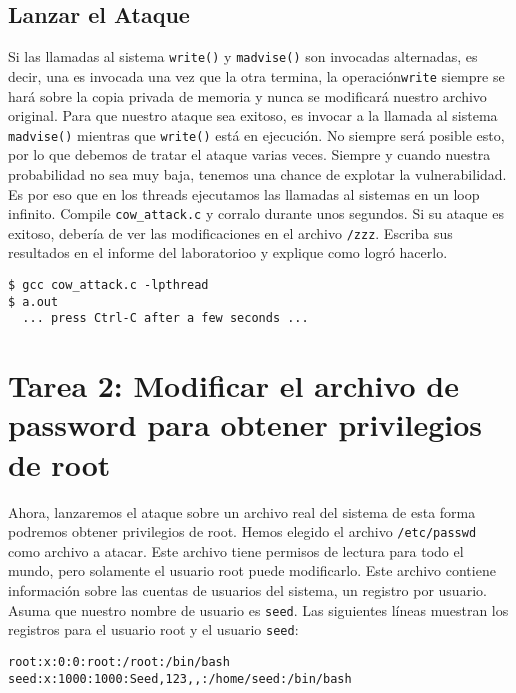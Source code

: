 \subsection{Lanzar el Ataque}

Si las llamadas al sistema \texttt{write()} y  \texttt{madvise()}  son invocadas alternadas, es decir, una es invocada una vez que la otra termina, la operación\texttt{write} siempre se hará sobre la copia privada de memoria y nunca se modificará nuestro archivo original. Para que nuestro ataque sea exitoso, es invocar a  la llamada al sistema \texttt{madvise()} mientras que \texttt{write()} está en ejecución. No siempre será posible esto, por lo que debemos de tratar el ataque varias veces. Siempre y cuando nuestra probabilidad no sea muy baja, tenemos una chance de explotar la vulnerabilidad. Es por eso que en los threads ejecutamos las llamadas al sistemas en un loop infinito.
Compile \texttt{cow\_attack.c} y corralo durante unos segundos. Si su ataque es exitoso, debería de ver las modificaciones en el archivo \texttt{/zzz}.
Escriba sus resultados en el informe del laboratorioo y explique como logró hacerlo.


\begin{lstlisting}
$ gcc cow_attack.c -lpthread
$ a.out
  ... press Ctrl-C after a few seconds ...
\end{lstlisting}



\section{Tarea 2: Modificar el archivo de password para obtener privilegios de root} 

Ahora, lanzaremos el ataque sobre un archivo real del sistema de esta forma podremos obtener privilegios de root.
Hemos elegido el archivo \texttt{/etc/passwd} como archivo a atacar. Este archivo tiene permisos de lectura para todo el mundo, pero solamente el usuario root puede modificarlo. Este archivo contiene información sobre las cuentas de usuarios del sistema, un registro por usuario. Asuma que nuestro nombre de usuario es \texttt{seed}. Las siguientes líneas muestran los registros para el usuario root y el usuario \texttt{seed}:

\begin{lstlisting}
root:x:0:0:root:/root:/bin/bash
seed:x:1000:1000:Seed,123,,:/home/seed:/bin/bash
\end{lstlisting}


